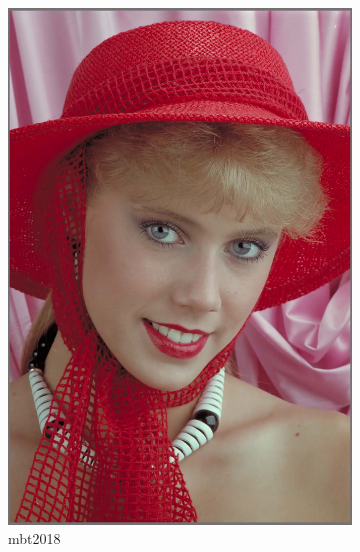 \begin{figure}[!h]
\begin{subfigure}[]{0.25\textwidth}
        \includegraphics[width=\textwidth]{Immagini/IMAGES/mbt2018_3_IMG0004.pdf}
        \caption{mbt2018}
        \label{fig:CompressedMbt2018}
    \end{subfigure}
    \hspace{0.5cm}
    \begin{subfigure}[]{0.25\textwidth}

\end{subfigure}
\end{figure}

